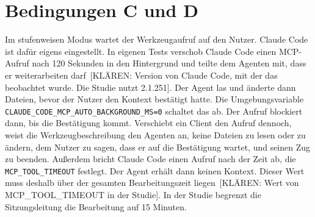\section{Bedingungen C und D}%
\label{sec:bedingungen}

Im stufenweisen Modus wartet der Werkzeugaufruf auf den Nutzer. Claude Code ist dafür eigens eingestellt. In eigenen Tests verschob Claude Code einen MCP-Aufruf nach 120 Sekunden in den Hintergrund und teilte dem Agenten mit, dass er weiterarbeiten darf~[KLÄREN: Version von Claude Code, mit der das beobachtet wurde. Die Studie nutzt 2.1.251]. Der Agent las und änderte dann Dateien, bevor der Nutzer den Kontext bestätigt hatte. Die Umgebungsvariable \texttt{CLAUDE\_CODE\_MCP\_AUTO\_BACKGROUND\_MS=0} schaltet das ab. Der Aufruf blockiert dann, bis die Bestätigung kommt. Verschiebt ein Client den Aufruf dennoch, weist die Werkzeugbeschreibung den Agenten an, keine Dateien zu lesen oder zu ändern, dem Nutzer zu sagen, dass er auf die Bestätigung wartet, und seinen Zug zu beenden. Außerdem bricht Claude Code einen Aufruf nach der Zeit ab, die \texttt{MCP\_TOOL\_TIMEOUT} festlegt. Der Agent erhält dann keinen Kontext. Dieser Wert muss deshalb über der gesamten Bearbeitungszeit liegen~[KLÄREN: Wert von MCP\_TOOL\_TIMEOUT in der Studie]. In der Studie begrenzt die Sitzungsleitung die Bearbeitung auf 15 Minuten.

